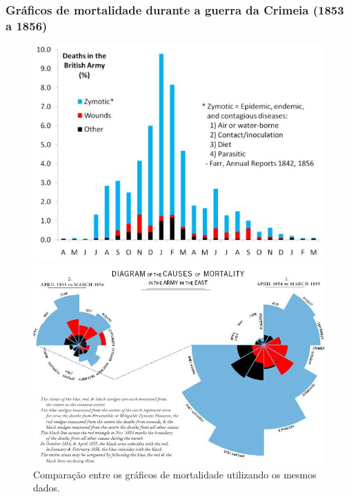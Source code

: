 \begin{frame}
\frametitle{Gráficos de mortalidade durante a guerra da Crimeia (1853 a 1856)}
\begin{figure}[htbp]
\begin{minipage}[t]{0.49\textwidth}
\includegraphics[width=\linewidth,height=0.8\textheight,keepaspectratio]{figures/ng_diagram2.jpg}
\end{minipage}
\hfill
\begin{minipage}[t]{0.49\textwidth}
\includegraphics[width=\linewidth,height=0.8\textheight,keepaspectratio]{figures/ng_diagram1.jpg}
\end{minipage}
\caption{Comparação entre os gráficos de mortalidade utilizando os mesmos dados.}
\end{figure}
\end{frame}


